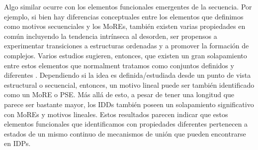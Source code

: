 % 
Algo similar ocurre con los elementos funcionales emergentes de la secuencia.
Por ejemplo, si bien hay diferencias conceptuales entre los elementos que definimos como motivos secuenciales y los MoREs, 
también existen varias propiedades en común incluyendo la tendencia intrínseca al desorden, ser propensos a experimentar transiciones a estructuras ordenadas y a promover la formación de complejos. 
Varios estudios sugieren, entonces, que existen un gran solapamiento entre estos elementos que normalment tratamos como conjuntos definidos y diferentes \cite{fuxreiter2007local,meszaros2012disordered}.
Dependiendo si la idea es definida/estudiada desde un punto de vista estructural o secuencial, entonces, un motivo lineal puede ser también identificado como un MoRE o PSE.
Más allá de esto, a pesar de tener una longitud que parece ser bastante mayor, los IDDs también poseen un solapamiento significativo con MoREs y motivos lineales.
Estos resultados parecen indicar que estos elementos funcionales que identificamos con propiedades diferentes pertenecen a estados de un mismo continuo de mecanismos de unión que pueden encontrarse en IDPs.



